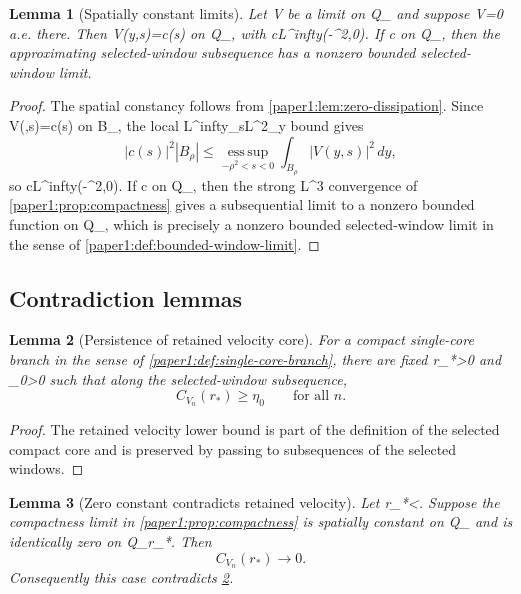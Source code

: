 \documentclass[11pt]{amsart}
\def\({}%
\def\){}%
\def\infty{infty}%
\theoremstyle{plain}
\newtheorem{lemma}[lemma]{Lemma}
\theoremstyle{definition}
\theoremstyle{remark}
\begin{document}
\begin{lemma}[Spatially constant limits]\label{paper1:lem:constant-limit}
Let \(V\) be a limit on \(Q_\rho\) and suppose \(\nabla V=0\) a.e. there.
Then \(V(y,s)=c(s)\) on \(Q_\rho\), with
\(c\in L^\infty(-\rho^2,0)\).  If \(c\not{}\) on \(Q_\rho\), then
the approximating selected-window subsequence has a nonzero bounded
selected-window limit.
\end{lemma}

\begin{proof}
The spatial constancy follows from \cref{paper1:lem:zero-dissipation}.  Since
\(V(\cdot,s)=c(s)\) on \(B_\rho\), the local \(L^\infty_sL^2_y\) bound gives
\[
  |c(s)|^2|B_\rho|\le \operatorname*{ess\,sup}_{-\rho^2<s<0}
  \int_{B_\rho}|V(y,s)|^2\,dy,
\]
so \(c\in L^\infty(-\rho^2,0)\).  If \(c\not{}\) on \(Q_\rho\), then the
strong \(L^3\) convergence of \cref{paper1:prop:compactness} gives a subsequential
limit to a nonzero bounded function on \(Q_\rho\), which is precisely a nonzero
bounded selected-window limit in the sense of \cref{paper1:def:bounded-window-limit}.
\end{proof}

\subsection{Contradiction lemmas}

\begin{lemma}[Persistence of retained velocity core]\label{paper1:lem:persistence}
For a compact single-core branch in the sense of \cref{paper1:def:single-core-branch},
there are fixed \(r_*>0\) and \(\eta_0>0\) such that along the selected-window
subsequence,
\[
  C_{V_n}(r_*)\ge\eta_0
  \qquad\text{for all }n.
\]
\end{lemma}

\begin{proof}
The retained velocity lower bound is part of the definition of the selected
compact core and is preserved by passing to subsequences of the selected
windows.
\end{proof}

\begin{lemma}[Zero constant contradicts retained velocity]\label{paper1:lem:zero-contradiction}
Let \(r_*<\rho\).  Suppose the compactness limit in \cref{paper1:prop:compactness} is
spatially constant on \(Q_\rho\) and is identically zero on \(Q_{r_*}\).  Then
\[
  C_{V_n}(r_*)\to0.
\]
Consequently this case contradicts \cref{paper1:lem:persistence}.
\end{lemma}
\end{document}
